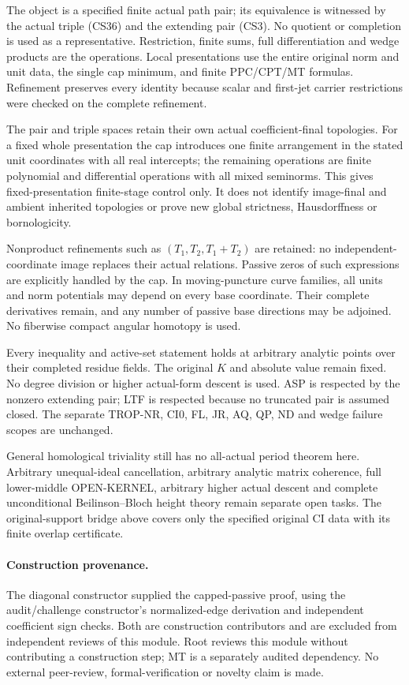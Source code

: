 The object is a specified finite actual path pair; its equivalence
is witnessed by the actual triple (CS36) and the extending pair
(CS3).  No quotient or completion is used as a representative.
Restriction, finite sums, full differentiation and wedge products
are the operations.  Local presentations use the entire original
norm and unit data, the single cap minimum, and finite PPC/CPT/MT
formulas.  Refinement preserves every identity because scalar and
first-jet carrier restrictions were checked on the complete
refinement.

The pair and triple spaces retain their own actual coefficient-final
topologies.  For a fixed whole presentation the cap introduces one
finite arrangement in the stated unit coordinates with all real
intercepts; the remaining operations are finite polynomial and
differential operations with all mixed seminorms.  This gives
fixed-presentation finite-stage control only.  It does not identify
image-final and ambient inherited topologies or prove new global
strictness, Hausdorffness or bornologicity.

Nonproduct refinements such as $(T_1,T_2,T_1+T_2)$ are retained:
no independent-coordinate image replaces their actual relations.
Passive zeros of such expressions are explicitly handled by the
cap.  In moving-puncture curve families, all units and norm
potentials may depend on every base coordinate.  Their complete
derivatives remain, and any number of passive base directions may
be adjoined.  No fiberwise compact angular homotopy is used.

Every inequality and active-set statement holds at arbitrary
analytic points over their completed residue fields.  The
original $K$ and absolute value remain fixed.  No degree
division or higher actual-form descent is used.  ASP is respected
by the nonzero extending pair; LTF is respected because no
truncated pair is assumed closed.  The separate TROP-NR, CI0,
FL, JR, AQ, QP, ND and wedge failure scopes are unchanged.

General homological triviality still has no all-actual period
theorem here.  Arbitrary unequal-ideal cancellation, arbitrary
analytic matrix coherence, full lower-middle OPEN-KERNEL,
arbitrary higher actual descent and complete unconditional
Beilinson--Bloch height theory remain separate open tasks.
The original-support bridge above covers only the specified
original CI data with its finite overlap certificate.

\paragraph{Construction provenance.}
The diagonal constructor supplied the capped-passive proof, using
the audit/challenge constructor's normalized-edge derivation and
independent coefficient sign checks.  Both are construction
contributors and are excluded from independent reviews of this
module.  Root reviews this module without contributing a
construction step; MT is a separately audited dependency.
No external peer-review, formal-verification or novelty claim
is made.

